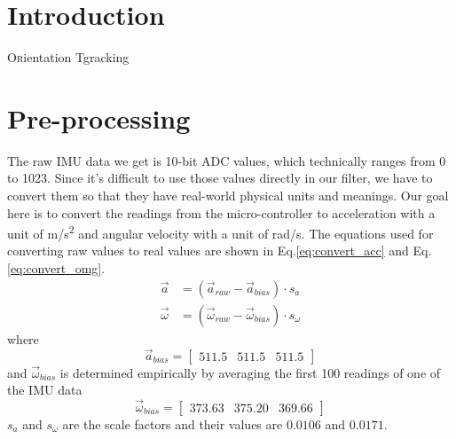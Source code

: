 \documentclass[twoside]{article}
\begin{document}
\begin{multicols}{2} %

\section{Introduction}
\lettrine[nindent=0em,lines=2]{O}rientation Tgracking


\section{Pre-processing}
The raw IMU data we get is 10-bit ADC values, which technically ranges from 0 to 1023. Since it's difficult to use those values directly in our filter, we have to convert them so that they have real-world physical units and meanings. Our goal here is to convert the readings from the micro-controller to acceleration with a unit of \si{m/s^2} and angular velocity with a unit of \si{\radian/s}.
The equations used for converting raw values to real values are shown in Eq.\ref{eq:convert_acc} and Eq.\ref{eq:convert_omg}.
\begin{align}
\label{eq:convert_acc}
\vec{a} &= (\vec{a}_{raw} - \vec{a}_{bias}) \cdot s_{a}\\
\vec{\omega} &= (\vec{\omega}_{raw} - \vec{\omega}_{bias}) \cdot s_{\omega}
\label{eq:convert_omg}
\end{align}
where 
\begin{equation}
\vec{a}_{bias} = \begin{bmatrix}511.5 & 511.5 & 511.5\end{bmatrix}
\end{equation}
and $\vec{\omega}_{bias}$ is determined empirically by averaging the first 100 readings of one of the IMU data
\begin{equation}
\vec{\omega}_{bias} = \begin{bmatrix}373.63 & 375.20 & 369.66\end{bmatrix}
\end{equation}
$s_{a}$ and $s_{\omega}$ are the scale factors and their values are $0.0106$ and $0.0171$.



\end{multicols}
\end{document}
